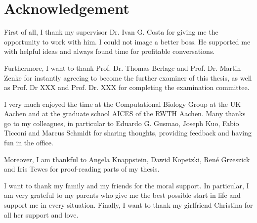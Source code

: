 \chapter*{Acknowledgement}
First of all, I thank my supervisor Dr. Ivan G. Costa for giving me the opportunity to work with him.
I could not image a better boss.
He supported me with helpful ideas and always found time for profitable conversations.

Furthermore, I want to thank Prof. Dr. Thomas Berlage and Prof. Dr. Martin Zenke for instantly agreeing to become the further examiner of this thesis, as well as Prof. Dr XXX and Prof. Dr. XXX for completing the examination committee.

I very much enjoyed the time at the Computational Biology Group at the UK Aachen and at the graduate school AICES of the RWTH Aachen. 
Many thanks go to my colleagues, in particular to Eduardo G. Gusmao, Joseph Kuo, Fabio Ticconi and Marcus Schmidt for sharing thoughts, providing feedback and having fun in the office.

Moreover, I am thankful to Angela Knappstein, Dawid Kopetzki, René Grzeszick and Iris Tewes for proof-reading parts of my thesis.

I want to thank my family and my friends for the moral support. 
In particular, I am very grateful to my parents who give me the best possible start in life and support me in every situation.
Finally, I want to thank my girlfriend Christina for all her support and love.
